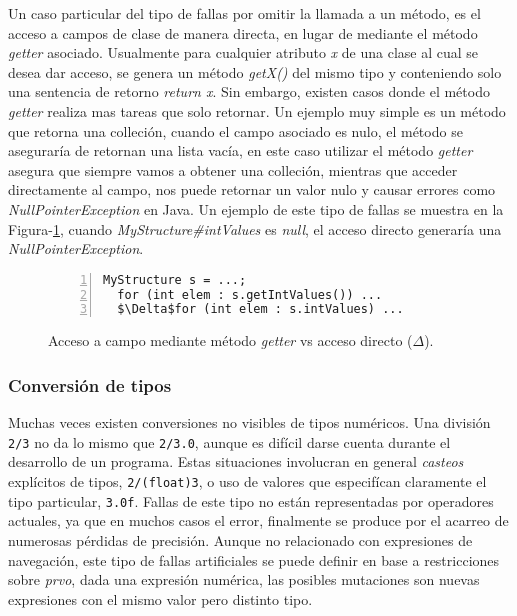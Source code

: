 Un caso particular del tipo de fallas por omitir la llamada a un m\'etodo, es el acceso a campos de clase de manera directa, en lugar de mediante el m\'etodo \emph{getter} asociado. Usualmente para cualquier atributo \emph{x} de una clase al cual se desea dar acceso, se genera un m\'etodo \emph{getX()} del mismo tipo y conteniendo solo una sentencia de retorno \emph{return x}. Sin embargo, existen casos donde el m\'etodo \emph{getter} realiza mas tareas que solo retornar. Un ejemplo muy simple es un m\'etodo que retorna una colleci\'on, cuando el campo asociado es nulo, el m\'etodo se asegurar\'ia de retornan una lista vac\'ia, en este caso utilizar el m\'etodo \emph{getter} asegura que siempre vamos a obtener una colleci\'on, mientras que acceder directamente al campo, nos puede retornar un valor nulo y causar errores como \emph{NullPointerException} en Java. Un ejemplo de este tipo de fallas se muestra en la Figura-\ref{figures.examples.getterVsDirectAccess}, cuando \emph{MyStructure\#intValues} es \emph{null}, el acceso directo generar\'ia una \emph{NullPointerException}.

\begin{figure}
	\begin{lstlisting}[frame=single, numbers=left, mathescape=true,framexleftmargin=1.5em]
  MyStructure s = ...;
  for (int elem : s.getIntValues()) ...
  $\Delta$for (int elem : s.intValues) ...
	\end{lstlisting}
	\caption{Acceso a campo mediante m\'etodo \emph{getter} vs acceso directo ($\Delta$).}
	\label{figures.examples.getterVsDirectAccess}
\end{figure}

\subsubsection{Conversi\'on de tipos}

Muchas veces existen conversiones no visibles de tipos num\'ericos. Una divisi\'on \texttt{2/3} no da lo mismo que \texttt{2/3.0}, aunque es dif\'icil darse cuenta durante el desarrollo de un programa. Estas situaciones involucran en general \emph{casteos} expl\'icitos de tipos, \texttt{2/(float)3}, o uso de valores que especif\'ican claramente el tipo particular, \texttt{3.0f}. Fallas de este tipo no est\'an representadas por operadores actuales, ya que en muchos casos el error, finalmente se produce por el acarreo de numerosas p\'erdidas de precisi\'on. Aunque no relacionado con expresiones de navegaci\'on, este tipo de fallas artificiales se puede definir en base a restricciones sobre \emph{prvo}, dada una expresi\'on num\'erica, las posibles mutaciones son nuevas expresiones con el mismo valor pero distinto tipo.

